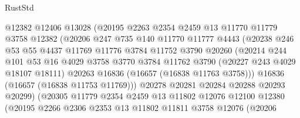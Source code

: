 \begin{lexlean}{RustStd}
\begin{coremodule}
                        @12382
                        @12406
                        @13028
                        (@20195
                          @2263
                          @2354
                          @2459
                          @13
                          @11770
                          @11779
                          @3758
                          @12382
                          (@20206
                            @247
                            @735
                            @140
                            @11770
                            @11777
                            @4443
                            (@20238
                              @246
                              @53
                              @55
                              @4437
                              @11769
                              @11776
                              @3784
                              @11752
                              @3790
                              @20260
                              (@20214
                                @244
                                @101
                                @53
                                @16
                                @4029
                                @3758
                                @3770
                                @3784
                                @11762
                                @3790
                                (@20227 @243 @4029 @18107 @18111)
                                @20263
                                @16836
                                (@16657 (@16838 @11763 @3758)))
                              @16836
                              (@16657 (@16838 @11753 @11769)))
                            @20278
                            @20281
                            @20284
                            @20288
                            @20293
                            @20299)
                          (@20305
                            @11779
                            @2354
                            @2459
                            @13
                            @11802
                            @12076
                            @12100
                            @12380
                            (@20195
                              @2266
                              @2306
                              @2353
                              @13
                              @11802
                              @11811
                              @3758
                              @12076
                              (@20206

\end{coremodule}
\end{lexlean}
